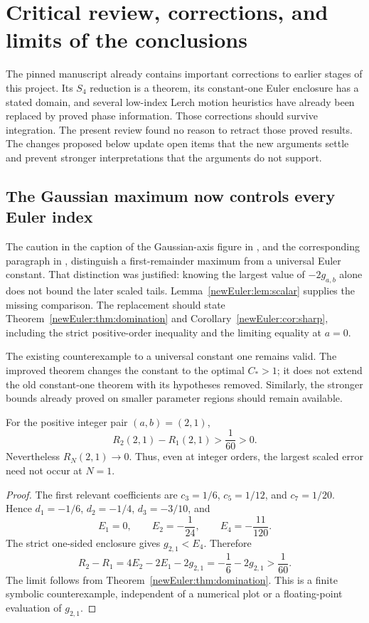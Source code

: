 \section{Critical review, corrections, and limits of the conclusions}
\label{sec:review}

The pinned manuscript already contains important corrections to earlier
stages of this project. Its $S_4$ reduction is a theorem, its constant-one
Euler enclosure has a stated domain, and several low-index Lerch motion
heuristics have already been replaced by proved phase information.
Those corrections should survive integration. The present review found
no reason to retract those proved results. The changes proposed below
update open items that the new arguments settle and prevent stronger
interpretations that the arguments do not support.

\subsection{The Gaussian maximum now controls every Euler index}

The caution in the caption of the Gaussian-axis figure in
, and the corresponding paragraph in
, distinguish a first-remainder maximum from a
universal Euler constant. That distinction was justified: knowing the
largest value of $-2g_{a,b}$ alone does not bound the later scaled tails.
Lemma~\ref{newEuler:lem:scalar} supplies the missing comparison. The
replacement should state Theorem~\ref{newEuler:thm:domination} and
Corollary~\ref{newEuler:cor:sharp}, including the strict positive-order
inequality and the limiting equality at $a=0$.

The existing counterexample to a universal constant one remains valid.
The improved theorem changes the constant to the optimal $C_*>1$;
it does not extend the old constant-one theorem with its hypotheses
removed. Similarly, the stronger bounds already proved on smaller
parameter regions should remain available.

\begin{proposition}
\label{prop:scaled-error-counterexample}
For the positive integer pair $(a,b)=(2,1)$,
\[
 R_2(2,1)-R_1(2,1)>\frac1{60}>0.
\]
Nevertheless $R_N(2,1)\to0$. Thus, even at integer orders, the largest
scaled error need not occur at $N=1$.
\end{proposition}
\begin{proof}
The first relevant coefficients are
$c_3=1/6$, $c_5=1/12$, and $c_7=1/20$. Hence
$d_1=-1/6$, $d_2=-1/4$, $d_3=-3/10$, and
\[
 E_1=0,\qquad E_2=-\frac1{24},\qquad E_4=-\frac{11}{120}.
\]
The strict one-sided enclosure gives $g_{2,1}<E_4$. Therefore
\[
 R_2-R_1=4E_2-2E_1-2g_{2,1}
       =-\frac16-2g_{2,1}>\frac1{60}.
\]
The limit follows from Theorem~\ref{newEuler:thm:domination}.
This is a finite symbolic counterexample, independent of a numerical
plot or a floating-point evaluation of $g_{2,1}$.
\end{proof}

